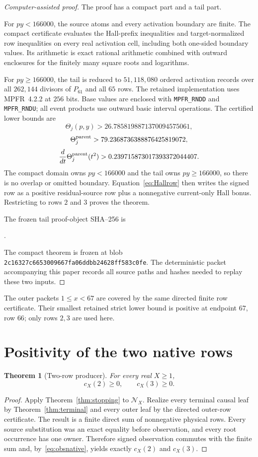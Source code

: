 \documentclass[11pt]{article}
\newtheorem{theorem}{Theorem}[section]
\newcommand{\Native}{\mathscr N}
\begin{document}
\begin{proof}[Computer-assisted proof]
The proof has a compact part and a tail part.

For $py<166000$, the source atoms and every activation boundary are finite.  The compact certificate evaluates the Hall-prefix inequalities and target-normalized row inequalities on every real activation cell, including both one-sided boundary values.  Its arithmetic is exact rational arithmetic combined with outward enclosures for the finitely many square roots and logarithms.

For $py\ge166000$, the tail is reduced to $51{,}118{,}080$ ordered activation records over all $262{,}144$ divisors of $P_{61}$ and all $65$ rows.  The retained implementation uses MPFR~4.2.2 at $256$ bits.  Base values are enclosed with \texttt{MPFR\_RNDD} and \texttt{MPFR\_RNDU}; all event products use outward basic interval operations.  The certified lower bounds are
\[
 \Theta_j(p,y)>26.7858198871370094575061,
\]
\[
 \Theta_j^{\rm parent}>79.2368736388876425819072,
\]
\[
 \frac{d}{dt}\Theta_j^{\rm parent}(t^2)
 >0.239715873017393372044407.
\]
The compact domain owns $py<166000$ and the tail owns $py\ge166000$, so there is no overlap or omitted boundary.  Equation~\eqref{eq:Hallrow} then writes the signed row as a positive residual-source row plus a nonnegative current-only Hall bonus.  Restricting to rows $2$ and $3$ proves the theorem.

The frozen tail proof-object SHA--256 is
\begin{center}
\texttt{}.
\end{center}
The compact theorem is frozen at blob
\texttt{2c16327c6653009667fa06ddbb24628ff583c0fe}.  The deterministic packet accompanying this paper records all source paths and hashes needed to replay these two inputs.
\end{proof}

The outer packets $1\le x<67$ are covered by the same directed finite row certificate.  Their smallest retained strict lower bound is positive at endpoint $67$, row $66$; only rows $2,3$ are used here.

\section{Positivity of the two native rows}
\label{sec:positivity}

\begin{theorem}[Two-row producer]
\label{thm:producer}
For every real $X\ge1$,
\[
 \boxed{c_X(2)\ge0,\qquad c_X(3)\ge0.}
\]
\end{theorem}
\begin{proof}
Apply Theorem~\ref{thm:stopping} to $\Native_X$.  Realize every terminal causal leaf by Theorem~\ref{thm:terminal} and every outer leaf by the directed outer-row certificate.  The result is a finite direct sum of nonnegative physical rows.  Every source substitution was an exact equality before observation, and every root occurrence has one owner.  Therefore signed observation commutes with the finite sum and, by~\eqref{eq:obsnative}, yields exactly $c_X(2)$ and $c_X(3)$.
\end{proof}
\end{document}
